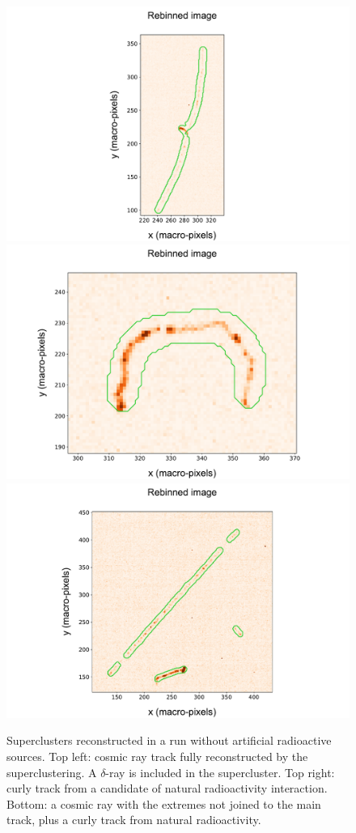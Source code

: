 \begin{figure}[ht]
  \begin{center}
     \includegraphics[width=0.49\linewidth]{figures/pic_run02156_ev49_sc_3D_paper}
     \includegraphics[width=0.49\linewidth]{figures/pic_run02156_ev641_sc_3D_paper} \\
     \includegraphics[width=0.6\linewidth]{figures/pic_run02156_ev631_sc_3D_paper}
     \caption{Superclusters reconstructed in a run without artificial radioactive
       sources.  Top left: cosmic ray track fully reconstructed by the \gac
       superclustering. A $\delta$-ray is included in the supercluster. Top right: curly track from a candidate of
       natural radioactivity interaction. Bottom: a cosmic ray with the
       extremes not joined to the main track, plus a curly track from
       natural radioactivity. \label{fig:super_clusters2}}
  \end{center}
\end{figure}
